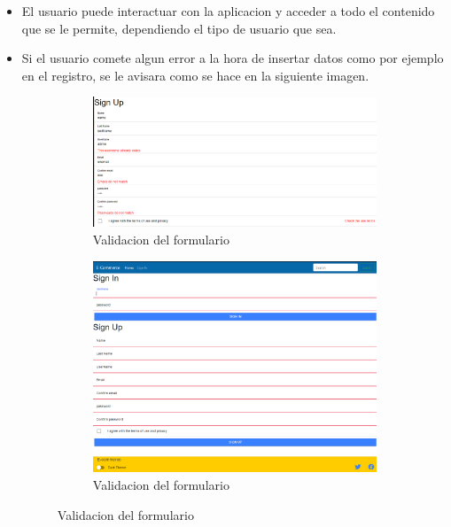\documentclass{article}
\begin{document}
\begin{itemize}
\begin{itemize}
\begin{figure}[h]
    \end{figure}
    \item El usuario puede interactuar con la aplicacion y acceder a todo el contenido que se le permite, dependiendo el tipo de usuario que sea.
    \item Si el usuario comete algun error a la hora de insertar datos como por ejemplo en el registro, se le avisara como se hace en la siguiente imagen.
    \begin{figure}[h]
        \ContinuedFloat
        \centering
        \begin{subfigure}[h]{0.45\textwidth}
        \includegraphics[scale=0.25]{usability/FormsErrors.png}
        \caption{Validacion del formulario}
        \label{Fig:FormsErrors}
        \end{subfigure}
        \begin{subfigure}[h]{0.45\textwidth}
            \includegraphics[scale=0.25]{usability/noData.png}
            \caption{Validacion del formulario}
            \label{Fig:FormsErrors2}
            \end{subfigure}

\end{figure}
\end{itemize}
\end{itemize}
\end{document}
